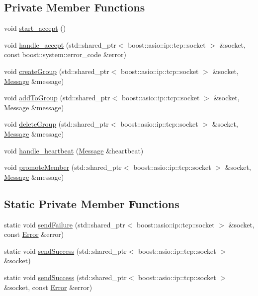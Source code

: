 \subsection*{Private Member Functions}
\begin{DoxyCompactItemize}
\item 
void \hyperlink{group___connection_handling_gab19cf3e5b775cd1b4eeb6d936340e712}{start\+\_\+accept} ()
\item 
void \hyperlink{group___connection_handling_ga447569609c9d667ab509e61d1dd1b476}{handle\+\_\+accept} (std\+::shared\+\_\+ptr$<$ boost\+::asio\+::ip\+::tcp\+::socket $>$ \&socket, const boost\+::system\+::error\+\_\+code \&error)
\item 
void \hyperlink{group___message_handling_ga81c419040ae028471a5737c4c0c50e3f}{create\+Group} (std\+::shared\+\_\+ptr$<$ boost\+::asio\+::ip\+::tcp\+::socket $>$ \&socket, \hyperlink{structshaan97_1_1sync_1_1_message}{Message} \&message)
\item 
void \hyperlink{group___message_handling_gaeb034e1663dff12c80bf7661f6216fe7}{add\+To\+Group} (std\+::shared\+\_\+ptr$<$ boost\+::asio\+::ip\+::tcp\+::socket $>$ \&socket, \hyperlink{structshaan97_1_1sync_1_1_message}{Message} \&message)
\item 
void \hyperlink{group___message_handling_gaedbdfea1f476a81e5f1ff3b632db9bad}{delete\+Group} (std\+::shared\+\_\+ptr$<$ boost\+::asio\+::ip\+::tcp\+::socket $>$ \&socket, \hyperlink{structshaan97_1_1sync_1_1_message}{Message} \&message)
\item 
void \hyperlink{group___message_handling_ga56230c5225416d342206232d3f2b8f6e}{handle\+\_\+heartbeat} (\hyperlink{structshaan97_1_1sync_1_1_message}{Message} \&heartbeat)
\item 
void \hyperlink{group___message_handling_ga46e08d6ffcd45a73aac315e8393e0228}{promote\+Member} (std\+::shared\+\_\+ptr$<$ boost\+::asio\+::ip\+::tcp\+::socket $>$ \&socket, \hyperlink{structshaan97_1_1sync_1_1_message}{Message} \&message)
\end{DoxyCompactItemize}
\subsection*{Static Private Member Functions}
\begin{DoxyCompactItemize}
\item 
static void \hyperlink{group___error_reporting_ga360b9e55725804cfba4a86c040001342}{send\+Failure} (std\+::shared\+\_\+ptr$<$ boost\+::asio\+::ip\+::tcp\+::socket $>$ \&socket, const \hyperlink{classshaan97_1_1sync_1_1_error}{Error} \&error)
\item 
static void \hyperlink{group___error_reporting_gaf606f6afc7f26d76733c7299599dd097}{send\+Success} (std\+::shared\+\_\+ptr$<$ boost\+::asio\+::ip\+::tcp\+::socket $>$ \&socket)
\item 
static void \hyperlink{group___error_reporting_ga1b81d60d6c76ec6852c73f2749e6e2a4}{send\+Success} (std\+::shared\+\_\+ptr$<$ boost\+::asio\+::ip\+::tcp\+::socket $>$ \&socket, const \hyperlink{classshaan97_1_1sync_1_1_error}{Error} \&error)
\end{DoxyCompactItemize}
